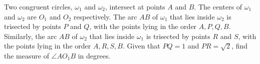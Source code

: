 Two congruent circles, $\omega_1$ and $\omega_2$, intersect at points $A$ and $B$. The centers of $\omega_1$ and $\omega_2$ are $O_1$ and $O_2$ respectively. The arc $AB$ of $\omega_1$ that lies inside $\omega_2$ is trisected by points $P$ and $Q$, with the points lying in the order $A, P, Q,B$. Similarly, the arc $AB$ of $\omega_2$ that lies inside $\omega_1$ is trisected by points $R$ and $S$, with the points lying in the order $A,R, S,B$. Given that $PQ = 1$ and $PR =\sqrt2$, find the measure of $\angle AO_1B$ in degrees.
